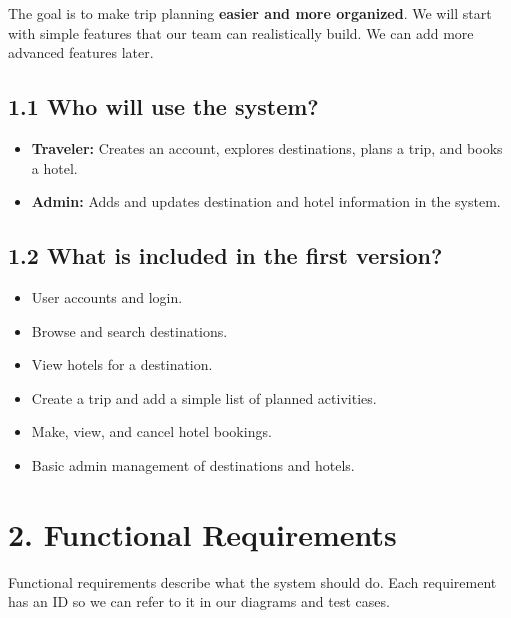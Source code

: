 \documentclass[11pt,a4paper]{article}
\begin{document}
The goal is to make trip planning \textbf{easier and more organized}. We will start with simple features that our team can realistically build. We can add more advanced features later.

\subsection{1.1 Who will use the system?}
\begin{itemize}
\item \textbf{Traveler:} Creates an account, explores destinations, plans a trip, and books a hotel.
\item \textbf{Admin:} Adds and updates destination and hotel information in the system.
\end{itemize}

\subsection{1.2 What is included in the first version?}
\begin{itemize}
\item User accounts and login.
\item Browse and search destinations.
\item View hotels for a destination.
\item Create a trip and add a simple list of planned activities.
\item Make, view, and cancel hotel bookings.
\item Basic admin management of destinations and hotels.
\end{itemize}

\section{2. Functional Requirements}
Functional requirements describe what the system should do. Each requirement has an ID so we can refer to it in our diagrams and test cases.
\end{document}

